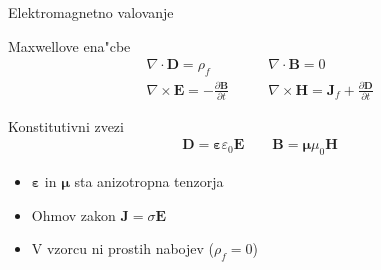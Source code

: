 \documentclass{beamer}
\newcommand{\odvod}[2]{\frac{\partial #1}{\partial #2}}
\renewcommand{\vec}{\mathbf}
\newcommand{\eps}{\varepsilon}
\begin{document}
\begin{frame}{Elektromagnetno valovanje}

\begin{block}{Maxwellove ena"cbe}
\begin{equation*}
\begin{aligned}
 \nabla \cdot \vec D = \rho_f & \qquad \nabla \cdot \vec B = 0 \\
 \nabla \times \vec E = -\odvod{\vec B}{t} & \qquad \nabla \times \vec H = \vec J_f + \odvod{\vec D}{t}
\end{aligned} 
\end{equation*}
\end{block}

\begin{block}{Konstitutivni zvezi}
\begin{equation*}
\begin{aligned}
\vec D = \boldsymbol\varepsilon \varepsilon_0 \vec E \qquad \vec B = \boldsymbol \mu \mu_0 \vec H
\end{aligned} 
\end{equation*}
\end{block}

\begin{itemize}
 \item $\boldsymbol\eps$ in $\boldsymbol\mu$ sta anizotropna tenzorja
 \item Ohmov zakon $\vec J = \sigma \vec E$
 \item V vzorcu ni prostih nabojev ($\rho_f = 0$)
\end{itemize}

\end{frame}
\end{document}
